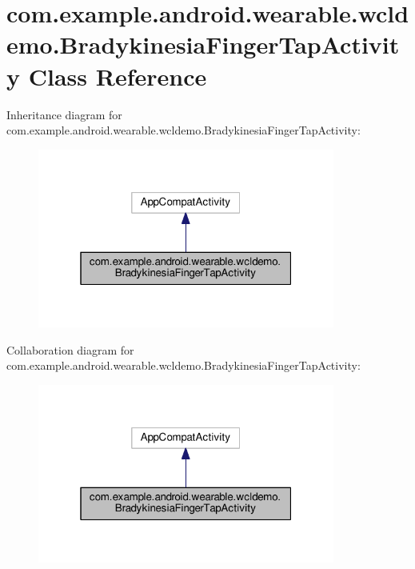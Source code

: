 \hypertarget{classcom_1_1example_1_1android_1_1wearable_1_1wcldemo_1_1BradykinesiaFingerTapActivity}{}\section{com.\+example.\+android.\+wearable.\+wcldemo.\+Bradykinesia\+Finger\+Tap\+Activity Class Reference}
\label{classcom_1_1example_1_1android_1_1wearable_1_1wcldemo_1_1BradykinesiaFingerTapActivity}


Inheritance diagram for com.\+example.\+android.\+wearable.\+wcldemo.\+Bradykinesia\+Finger\+Tap\+Activity\+:\nopagebreak
\begin{figure}[H]
\begin{center}
\leavevmode
\includegraphics[width=277pt]{d3/d92/classcom_1_1example_1_1android_1_1wearable_1_1wcldemo_1_1BradykinesiaFingerTapActivity__inherit__graph}
\end{center}
\end{figure}


Collaboration diagram for com.\+example.\+android.\+wearable.\+wcldemo.\+Bradykinesia\+Finger\+Tap\+Activity\+:\nopagebreak
\begin{figure}[H]
\begin{center}
\leavevmode
\includegraphics[width=277pt]{d7/d21/classcom_1_1example_1_1android_1_1wearable_1_1wcldemo_1_1BradykinesiaFingerTapActivity__coll__graph}
\end{center}
\end{figure}
